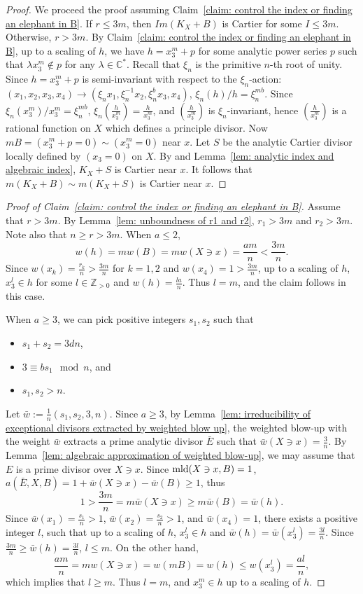 \documentclass[11pt]{amsart}
\numberwithin{equation}{section}
\newcommand{\Cc}{\mathbb{C}}
\newcommand{\Zz}{\mathbb{Z}}
\newcommand{\mld}{{\rm{mld}}}
\theoremstyle{definition}
\theoremstyle{definition}
\begin{document}
\begin{proof}
We proceed the proof assuming Claim~\ref{claim: control the index or finding an elephant in B}. If $r\leq 3m$, then $Im(K_X+B)$ is Cartier for some $I\leq 3m$. Otherwise, $r>3m$. By Claim~\ref{claim: control the index or finding an elephant in B}, up to a scaling of $h$, we have $h=x_3^m+p$ for some analytic power series $p$ such that $\lambda x_3^m\notin p$ for any $\lambda\in \Cc^*$. Recall that $\xi_n$ is the primitive $n$-th root of unity. Since $h=x_3^m+p$ is semi-invariant with respect to the $\xi_n$-action: $(x_1,x_2,x_3,x_4)\rightarrow (\xi_nx_1,\xi_n^{-1}x_2,\xi_n^{b}x_3,x_4)$, $\xi_n(h)/h=\xi_n^{mb}$. Since $\xi_n(x_3^m)/x_3^m=\xi_n^{mb}$, $\xi_n(\frac{h}{x_3^m})=\frac{h}{x_3^m}$, and $(\frac{h}{x_3^m})$ is $\xi_n$-invariant, hence $(\frac{h}{x_3^m})$ is a rational function on $X$ which defines a principle divisor. Now $mB=(x_3^m+p=0)\sim (x_3^m=0)$ near $x$. Let $S$ be the analytic Cartier divisor locally defined by $(x_3=0)$ on $X$. By \cite[(6.4)(B.1)]{Rei87} and Lemma~\ref{lem: analytic index and algebraic index}, $K_X+S$ is Cartier near $x$. It follows that $m(K_X+B)\sim m(K_X+S)$ is Cartier near $x$.
\end{proof}



\begin{proof}[Proof of Claim~\ref{claim: control the index or finding an elephant in B}]
Assume that $r>3m$. By Lemma~\ref{lem: unboundness of r1 and r2}, $r_1> 3m$ and $r_2> 3m$. Note also that $n\geq r>3m$. When $a\leq 2$,  $$w(h)=mw(B)=mw(X\ni x)=\frac{am}{n}< \frac{3m}{n}.$$ Since $w(x_k)=\frac{r_k}{n}> \frac{3m}{n}$ for $k=1,2$ and $w(x_4)=1> \frac{3m}{n}$, up to a scaling of $h$, $x_3^l\in h$ for some $l\in \Zz_{>0}$ and $w(h)=\frac{la}{n}$. Thus $l=m$, and the claim follows in this case.

\medskip

When $a\geq 3$, we can pick positive integers $s_1,s_2$ such that
\begin{itemize}
    \item $s_1+s_2=3dn$,
    \item $3\equiv bs_1\mod n$, and
    \item $s_1,s_2>n$.
\end{itemize}
Let $\bar w:=\frac{1}{n}(s_1,s_2,3,n)$. Since $a\geq 3$, by Lemma~\ref{lem: irreducibility of exceptional divisors extracted by weighted blow up}, the weighted blow-up with the weight $\bar w$ extracts a prime analytic divisor $\bar E$ such that $\bar w(X\ni x)=\frac{3}{n}$. By Lemma~\ref{lem: algebraic approximation of weighted blow-up}, we may assume that $E$ is a prime divisor over $X\ni x$. Since $\mld(X\ni x,B)=1$, $a(\bar{E},X,B)=1+\bar{w}(X\ni x)-\bar{w}(B)\geq 1$, thus
$$1>\frac{3m}{n}=m\bar w(X\ni x)\geq m\bar{w}(B)=\bar w(h).$$
Since $\bar w(x_1)=\frac{s_1}{n}>1$, $\bar w(x_2)=\frac{s_2}{n}>1$, and $\bar w(x_4)=1$, there exists a positive integer $l$, such that up to a scaling of $h$, $x_3^l\in h$ and $\bar{w}(h)=\bar w(x_3^l)=\frac{3l}{n}$. Since
$\frac{3m}{n}\geq\bar w(h)=\frac{3l}{n}$, $l\leq m$. On the other hand,
$$\frac{am}{n}=mw(X\ni x)=w(mB)=w(h)\leq w(x_3^l)=\frac{al}{n},$$
which implies that $l\geq m$. Thus $l=m$, and $x_3^m\in h$ up to a scaling of $h$.
\end{proof}
\end{document}
